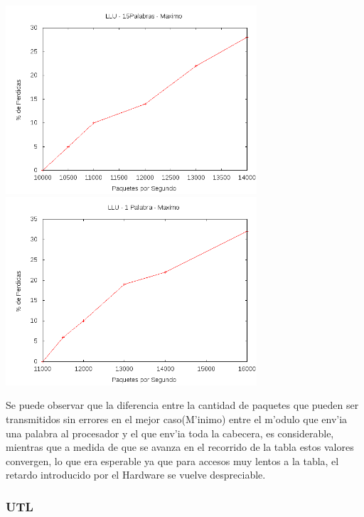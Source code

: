 \documentclass[12pt,spanish]{article}
\begin{document}
\begin{center}
\includegraphics[width=0.7\textwidth]{graf/llu15pmax.png}
\includegraphics[width=0.7\textwidth]{graf/llu1pmax.png}	
\end{center}


Se puede observar que la diferencia entre la cantidad de paquetes que pueden ser transmitidos sin errores en el mejor caso(M'inimo) entre el m'odulo que env'ia una palabra al procesador y el que env'ia toda la cabecera, es considerable, mientras que a medida de que se avanza en el recorrido de la tabla estos valores convergen, lo que era esperable ya que para accesos muy lentos a la tabla, el retardo introducido por el Hardware se vuelve despreciable.


\subsubsection{UTL}
\end{document}
